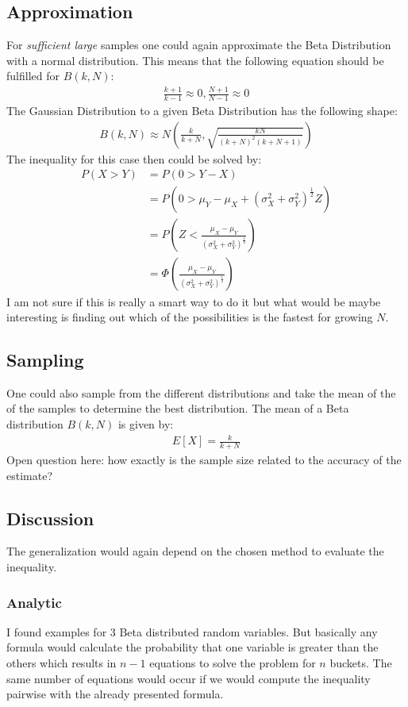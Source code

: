 \documentclass[../Thesis.tex]{subfiles}
\begin{document}
\subsection{Approximation}
For \textit{sufficient large} samples one could again approximate the Beta Distribution with a normal distribution. This means that the following equation should be fulfilled for $B(k,N)$:
\begin{align*}
\frac{k + 1}{k - 1}\approx 0,
\frac{N + 1}{N - 1}\approx 0
\end{align*}
The Gaussian Distribution to a given Beta Distribution has the following shape:
\begin{align*}
B(k,N)\approx N\left(\frac{k}{k+N},\sqrt{\frac{kN}{(k+N)^2(k+N+1)}} \right)
\end{align*}
The inequality for this case then could be solved by:
\begin{align*}
P(X>Y)	&= P(0 > Y - X) \\
			&= P(0 > \mu_Y - \mu_X + (\sigma_X^2 + \sigma_Y^2)^{\frac{1}{2}}Z) \\
			&= P\left(Z < \frac{\mu_X - \mu_Y}{(\sigma_X^2 + \sigma_Y^2)^{\frac{1}{2}}}\right) \\
			&= \Phi\left(\frac{\mu_X - \mu_Y}{(\sigma_X^2 + \sigma_Y^2)^{\frac{1}{2}}}\right)
\end{align*}
I am not sure if this is really a smart way to do it but what would be maybe interesting is finding out which of the possibilities is the fastest for growing $N$.

\subsection{Sampling}
One could also sample from the different distributions and take the mean of the of the samples to determine the best distribution. The mean of a Beta distribution $B(k,N)$ is given by:
\begin{align*}
E[X] = \frac{k}{k+N}
\end{align*}
Open question here: how exactly is the sample size related to the accuracy of the estimate?

\subsection{Discussion}
The generalization would again depend on the chosen method to evaluate the inequality.
\subsubsection{Analytic}
I found examples for 3 Beta distributed random variables. But basically any formula would calculate the probability that one variable is greater than the others which results in $n-1$ equations to solve the problem for $n$ buckets. The same number of equations would occur if we would compute the inequality pairwise with the already presented formula.
\end{document}
